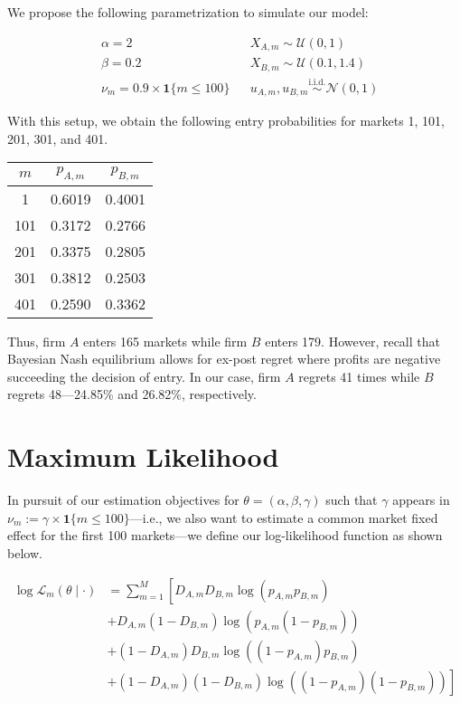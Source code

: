 \documentclass[cm,linguex]{glossa}
\newcommand{\iid}{\text{i.i.d.}}
\newcommand{\dnorm}{\mathcal{N}}
\newcommand{\dunif}{\mathcal{U}}
\begin{document}
We propose the following parametrization to simulate our model:

\begin{align*}
&\alpha =  2 && X_{A,m} \sim \dunif(0, 1) \\
&\beta = 0.2 && X_{B, m} \sim \dunif(0.1, 1.4) \\
&\nu_m = 0.9 \times \mathbf{1} \{ m \leq 100 \} && u_{A, m}, u_{B, m} \overset{\iid}{\sim} \dnorm(0, 1)
\end{align*}

With this setup, we obtain the following entry probabilities for markets
1, 101, 201, 301, and 401.

\begin{longtable}[]{@{}ccc@{}}
\toprule()
\(m\) & \(p_{A, m}\) & \(p_{B, m}\) \\
\midrule()
\endhead
1 & 0.6019 & 0.4001 \\
101 & 0.3172 & 0.2766 \\
201 & 0.3375 & 0.2805 \\
301 & 0.3812 & 0.2503 \\
401 & 0.2590 & 0.3362 \\
\bottomrule()
\end{longtable}

Thus, firm \(A\) enters 165 markets while firm \(B\) enters 179.
However, recall that Bayesian Nash equilibrium allows for ex-post regret
where profits are negative succeeding the decision of entry. In our
case, firm \(A\) regrets 41 times while \(B\) regrets 48---24.85\% and
26.82\%, respectively.

\newpage

\hypertarget{maximum-likelihood}{%
\section{Maximum Likelihood}\label{maximum-likelihood}}

In pursuit of our estimation objectives for
\(\theta = (\alpha, \beta, \gamma)\) such that \(\gamma\) appears in
\(\nu_m := \gamma \times \mathbf{1} \{ m \leq 100 \}\)---i.e., we also
want to estimate a common market fixed effect for the first 100
markets---we define our log-likelihood function as shown below.

\begin{align*}
\log\mathcal{L}_{m} (\theta \mid \cdot) &= \sum_{m = 1}^{M} \left[ D_{A, m} D_{B, m} \log(p_{A, m} p_{B, m}) \right. \\
&+ D_{A, m} (1 - D_{B, m}) \log(p_{A, m} (1 - p_{B, m})) \\
&+ (1 - D_{A, m}) D_{B, m} \log((1 - p_{A, m}) p_{B, m}) \\
&+ \left. (1 - D_{A, m}) (1 - D_{B, m}) \log((1 - p_{A, m}) (1 - p_{B, m})) \right]
\end{align*}
\end{document}
